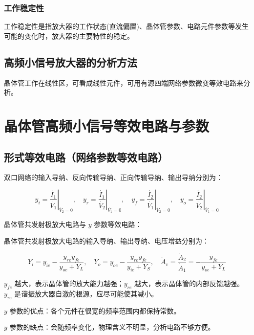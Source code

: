 \subsubsection{工作稳定性}

工作稳定性是指放大器的工作状态(直流偏置)、晶体管参数、电路元件参数等发生可能的变化时，放大器的主要特性的稳定。

\subsection{高频小信号放大器的分析方法}

晶体管工作在线性区，可看成线性元件，可用有源四端网络参数微变等效电路来分析。

\section{晶体管高频小信号等效电路与参数}

\subsection{形式等效电路（网络参数等效电路）}

双口网络的输入导纳、反向传输导纳、正向传输导纳、输出导纳分别为：

\begin{equation}
    y_i = \left. \frac{\dot{I_1}}{\dot{V_1}} \right|_{\dot{V_2} = 0}, \quad 
    y_r = \left. \frac{\dot{I_1}}{\dot{V_2}} \right|_{\dot{V_1} = 0}, \quad 
    y_f = \left. \frac{\dot{I_2}}{\dot{V_1}} \right|_{\dot{V_2} = 0}, \quad 
    y_o = \left. \frac{\dot{I_2}}{\dot{V_2}} \right|_{\dot{V_1} = 0}
\end{equation}

晶体管共发射极放大电路与 $y$ 参数等效电路：

晶体管共发射极放大电路的输入导纳、输出导纳、电压增益分别为：

\begin{equation}
    Y_i = y_{ie} - \frac{y_{re}y_{fe}}{y_{oe} + Y_L}, \quad 
    Y_o = y_{oe} - \frac{y_{re}y_{fe}}{y_{ie} + Y_S}, \quad 
    \dot{A}_v = \frac{\dot{A}_2}{\dot{A}_1} = - \frac{y_{fe}}{y_{oe} + Y_L}
\end{equation}

$y_{fe}$ 越大，表示晶体管的放大能力越强；$y_{re}$ 越大，表示晶体管的内部反馈越强。$y_{re}$ 是谐振放大器自激的根源，应尽可能使其减小。   

$y$ 参数的优点：各个元件在很宽的频率范围内都保持常数。

$y$ 参数的缺点：会随频率变化，物理含义不明显，分析电路不够方便。

